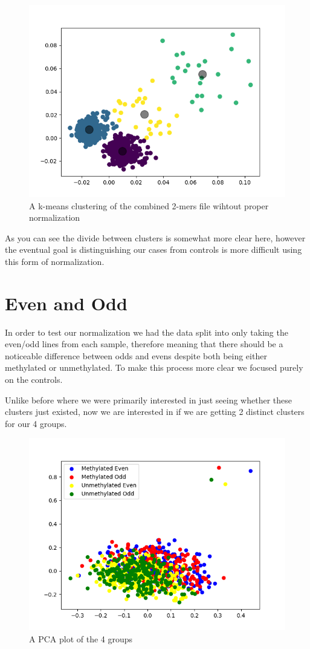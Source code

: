 \begin{figure}[H]
	\centering
	\includegraphics[width=0.7\linewidth]{../../figures/without_background/combined_2mers.png}
	\caption{A k-means clustering of the combined 2-mers file wihtout proper normalization}
	\label{fig:kmeans1}
\end{figure}

As you can see the divide between clusters is somewhat more clear here, however the eventual goal is distinguishing our cases from controls is more difficult using this form of normalization.

\section{Even and Odd}
In order to test our normalization we had the data split into only taking the even/odd lines from each sample, therefore meaning that there should be a noticeable difference between odds and evens despite both being either methylated or unmethylated. To make this process more clear we focused purely on the controls. 

Unlike before where we were primarily interested in just seeing whether these clusters just existed, now we are interested in if we are getting 2 distinct clusters for our 4 groups. 

\begin{figure}[H]
	\centering
	\includegraphics[width=0.7\linewidth]{../../figures/all_healthy/all_healthy.png}
	\caption{A PCA plot of the 4 groups}
	\label{fig:allhealthy0}
\end{figure}

